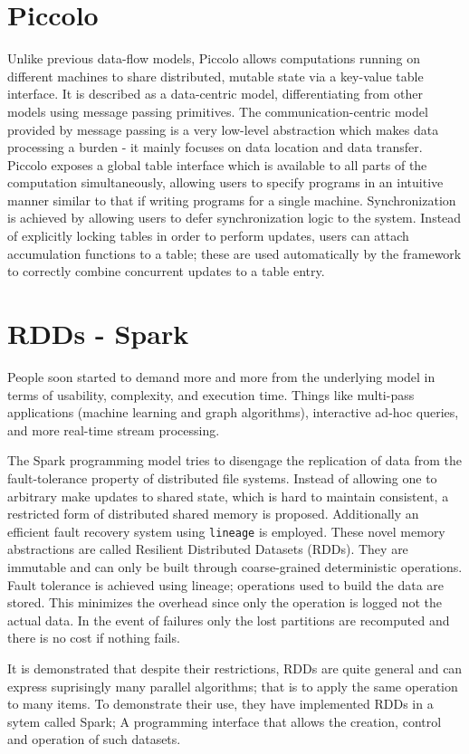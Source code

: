 \documentclass[letterpaper,twocolumn,10pt]{article}
\begin{document}
\section{Piccolo}
Unlike previous data-flow models, Piccolo allows computations running on different machines to share distributed, mutable state via a key-value table  interface. It is described as a data-centric model, differentiating from other models using message passing primitives. The communication-centric model provided by message passing is a very low-level abstraction which makes data processing a burden - it mainly focuses on data location and data transfer. Piccolo exposes a global table interface which is available to all parts of the computation simultaneously, allowing users to specify programs in an intuitive manner similar to that if writing programs for a single machine. Synchronization is achieved by allowing users to defer synchronization logic to the system. Instead of explicitly locking tables in order to perform updates, users can attach accumulation functions to a table; these are used automatically by the framework to correctly combine concurrent updates to a table entry.

\section{RDDs - Spark}
People soon started to demand more and more from the underlying model in terms of usability, complexity, and execution time. Things like multi-pass applications (machine learning and graph algorithms), interactive ad-hoc queries, and more real-time stream processing. 

The Spark programming model tries to disengage the replication of data from the fault-tolerance property of distributed file systems. Instead of allowing one to arbitrary make updates to shared state, which is hard to maintain consistent, a restricted form of distributed shared memory is proposed. Additionally an efficient fault recovery system using {\tt lineage} is employed. These novel memory abstractions are called Resilient Distributed Datasets (RDDs). They are immutable and can only be built through coarse-grained deterministic operations. Fault tolerance is achieved using lineage; operations used to build the data are stored. This minimizes the overhead since only the operation is logged not the actual data. In the event of failures only the lost partitions are recomputed and there is no cost if nothing fails.

It is demonstrated that despite their restrictions, RDDs are quite general and can express suprisingly many parallel algorithms; that is to apply the same operation to many items. To demonstrate their use, they have implemented RDDs in a sytem called Spark; A programming interface that allows the creation, control and operation of such datasets.
\end{document}
